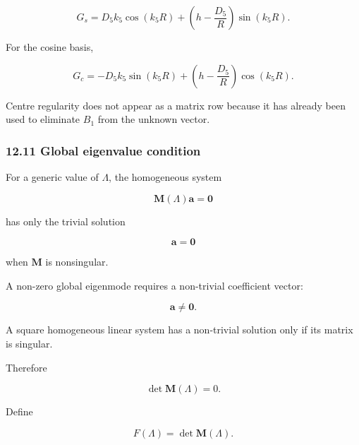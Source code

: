 \documentclass[11pt,a4paper]{article}
\begin{document}
\begin{equation}
G_s
=
D_5k_5\cos(k_5R)
+
\left(
h-\frac{D_5}{R}
\right)
\sin(k_5R).
\tag{TRISO-ML-469}
\label{eq:triso-ml-469}
\end{equation}

For the cosine basis,

\begin{equation}
G_c
=
-D_5k_5\sin(k_5R)
+
\left(
h-\frac{D_5}{R}
\right)
\cos(k_5R).
\tag{TRISO-ML-470}
\label{eq:triso-ml-470}
\end{equation}

Centre regularity does not appear as a matrix row because it has already been used to eliminate $B_1$ from the unknown vector.

\subsubsection*{12.11 Global eigenvalue condition}

For a generic value of $\Lambda$, the homogeneous system

\begin{equation}
\mathbf M(\Lambda)\mathbf a=\mathbf0
\tag{TRISO-ML-471}
\label{eq:triso-ml-471}
\end{equation}

has only the trivial solution

\begin{equation}
\mathbf a=\mathbf0
\tag{TRISO-ML-472}
\label{eq:triso-ml-472}
\end{equation}

when $\mathbf M$ is nonsingular.

A non-zero global eigenmode requires a non-trivial coefficient vector:

\begin{equation}
\mathbf a\ne\mathbf0.
\tag{TRISO-ML-473}
\label{eq:triso-ml-473}
\end{equation}

A square homogeneous linear system has a non-trivial solution only if its matrix is singular.

Therefore

\begin{equation}
\boxed{
\det\mathbf M(\Lambda)=0.
}
\tag{TRISO-ML-474}
\label{eq:triso-ml-474}
\end{equation}

Define

\begin{equation}
\boxed{
F(\Lambda)=\det\mathbf M(\Lambda).
}
\tag{TRISO-ML-475}
\label{eq:triso-ml-475}
\end{equation}
\end{document}
